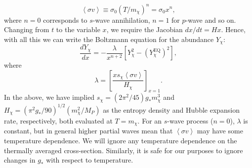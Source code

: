 \begin{equation}
\left \langle \sigma v \right \rangle \equiv \sigma_0 (T/m_{\chi})^n = \sigma_0 x^n,
\end{equation}
where $n=0$ corresponds to $s$-wave annihilation, $n=1$ for $p$-wave and so on. Changing from $t$ to the variable $x$, we require the Jacobian $dx/dt=Hx$. Hence, with all this we can write the Boltzmann equation for the abundance $Y_{\chi}$:
\begin{equation}
\frac{dY_{\chi}}{dx} = -\frac{\lambda}{x^{n+2}} \left[ Y_{\chi}^2-(Y^{\text{EQ}}_{\chi})^2 \right],
\label{eqn:YBoltz}
\end{equation}
where
\begin{equation}
\lambda = \left[ \frac{x s_{\chi} \left \langle \sigma v \right \rangle}{H_{\chi}}\right]_{x=1}.
\end{equation}
In the above, we have implied $s_{\chi}=(2\pi^2/45)g_{*}m^3_{\chi}$ and $H_{\chi}=(\pi^2g_{*}/90)^{1/2} (m^2_{\chi}/M_P)$ as the entropy density and Hubble expansion rate, respectively, both evaluated at $T=m_{\chi}$. For an $s$-wave process ($n=0$), $\lambda$ is constant, but in general higher partial waves mean that $\left \langle \sigma v \right \rangle$ may have some temperature dependence. We will ignore any temperature dependence on the thermally averaged cross-section. Similarly, it is safe for our purposes to ignore changes in $g_*$ with respect to temperature.

